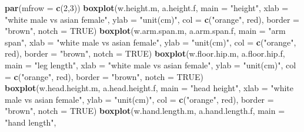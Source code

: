 \documentclass[]{article}
\newenvironment{Shaded}{\begin{snugshade}}{\end{snugshade}}
\newcommand{\DataTypeTok}[1]{\textcolor[rgb]{0.13,0.29,0.53}{#1}}
\newcommand{\DecValTok}[1]{\textcolor[rgb]{0.00,0.00,0.81}{#1}}
\newcommand{\KeywordTok}[1]{\textcolor[rgb]{0.13,0.29,0.53}{\textbf{#1}}}
\newcommand{\NormalTok}[1]{#1}
\newcommand{\OtherTok}[1]{\textcolor[rgb]{0.56,0.35,0.01}{#1}}
\newcommand{\StringTok}[1]{\textcolor[rgb]{0.31,0.60,0.02}{#1}}
\begin{document}
\begin{Shaded}
\begin{Highlighting}[]
\KeywordTok{par}\NormalTok{(}\DataTypeTok{mfrow =} \KeywordTok{c}\NormalTok{(}\DecValTok{2}\NormalTok{,}\DecValTok{3}\NormalTok{))}
\KeywordTok{boxplot}\NormalTok{(w.height.m, a.height.f,}
        \DataTypeTok{main =} \StringTok{"height"}\NormalTok{,}
        \DataTypeTok{xlab =} \StringTok{"white male vs asian female"}\NormalTok{,}
        \DataTypeTok{ylab =} \StringTok{"unit(cm)"}\NormalTok{,}
        \DataTypeTok{col =} \KeywordTok{c}\NormalTok{(}\StringTok{"orange"}\NormalTok{, }\StringTok{\textquotesingle{}red\textquotesingle{}}\NormalTok{),}
        \DataTypeTok{border =} \StringTok{"brown"}\NormalTok{,}
        \DataTypeTok{notch =} \OtherTok{TRUE}\NormalTok{)}
\KeywordTok{boxplot}\NormalTok{(w.arm.span.m, a.arm.span.f,}
        \DataTypeTok{main =} \StringTok{"arm span"}\NormalTok{,}
        \DataTypeTok{xlab =} \StringTok{"white male vs asian female"}\NormalTok{,}
        \DataTypeTok{ylab =} \StringTok{"unit(cm)"}\NormalTok{,}
        \DataTypeTok{col =} \KeywordTok{c}\NormalTok{(}\StringTok{"orange"}\NormalTok{, }\StringTok{\textquotesingle{}red\textquotesingle{}}\NormalTok{),}
        \DataTypeTok{border =} \StringTok{"brown"}\NormalTok{,}
        \DataTypeTok{notch =} \OtherTok{TRUE}\NormalTok{)}
\KeywordTok{boxplot}\NormalTok{(w.floor.hip.m, a.floor.hip.f, }
        \DataTypeTok{main =} \StringTok{"leg length"}\NormalTok{,}
        \DataTypeTok{xlab =} \StringTok{"white male vs asian female"}\NormalTok{,}
        \DataTypeTok{ylab =} \StringTok{"unit(cm)"}\NormalTok{,}
        \DataTypeTok{col =} \KeywordTok{c}\NormalTok{(}\StringTok{"orange"}\NormalTok{, }\StringTok{\textquotesingle{}red\textquotesingle{}}\NormalTok{),}
        \DataTypeTok{border =} \StringTok{"brown"}\NormalTok{,}
        \DataTypeTok{notch =} \OtherTok{TRUE}\NormalTok{)}
\KeywordTok{boxplot}\NormalTok{(w.head.height.m, a.head.height.f,}
        \DataTypeTok{main =} \StringTok{"head height"}\NormalTok{,}
        \DataTypeTok{xlab =} \StringTok{"white male vs asian female"}\NormalTok{,}
        \DataTypeTok{ylab =} \StringTok{"unit(cm)"}\NormalTok{,}
        \DataTypeTok{col =} \KeywordTok{c}\NormalTok{(}\StringTok{"orange"}\NormalTok{, }\StringTok{\textquotesingle{}red\textquotesingle{}}\NormalTok{),}
        \DataTypeTok{border =} \StringTok{"brown"}\NormalTok{,}
        \DataTypeTok{notch =} \OtherTok{TRUE}\NormalTok{)}
\KeywordTok{boxplot}\NormalTok{(w.hand.length.m, a.hand.length.f,}
        \DataTypeTok{main =} \StringTok{"hand length"}\NormalTok{,}

\end{Highlighting}
\end{Shaded}
\end{document}
